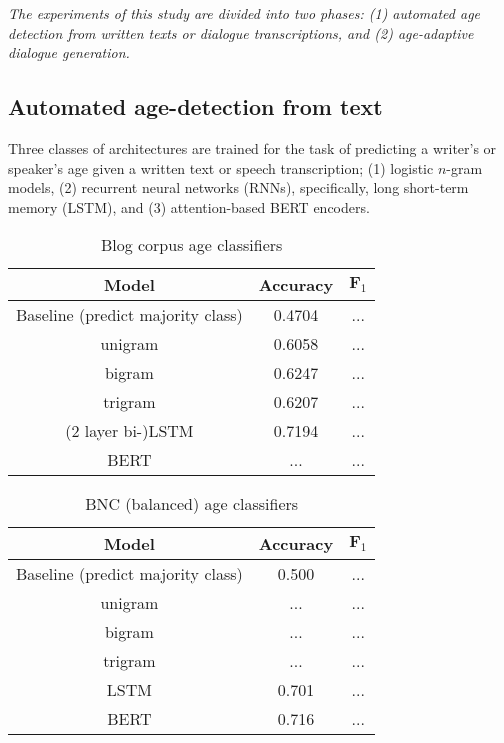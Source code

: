 \textit{The experiments of this study are divided into two phases: (1) automated age detection from written texts or dialogue transcriptions, and (2) age-adaptive dialogue generation.}

\subsection{Automated age-detection from text}

Three classes of architectures are trained for the task of predicting a writer's or speaker's age given a written text or speech transcription; (1) logistic $n$-gram models, (2) recurrent neural networks (RNNs), specifically, long short-term memory (LSTM), and (3) attention-based BERT encoders.

\begin{table}[H]
    \centering
    \begin{tabular}{c c c}
    \hline
    \textbf{Model} & \textbf{Accuracy} & $\boldsymbol{F}_1$\\
    \hline
    Baseline (predict majority class) & 0.4704 & ...\\
    unigram & 0.6058 & ...\\
    bigram & 0.6247 & ...\\
    trigram & 0.6207 & ...\\
    (2 layer bi-)LSTM & 0.7194 & ...\\
    BERT & ... & ...\\
    \hline
    \end{tabular}
    \caption{Blog corpus age classifiers}
    \label{tab:blog_classification}
\end{table}

\begin{table}[H]
    \centering
    \begin{tabular}{c c c}
    \hline
    \textbf{Model} & \textbf{Accuracy} & $\boldsymbol{F}_1$\\
    \hline
    Baseline (predict majority class) & 0.500 & ...\\
    unigram & ... & ...\\
    bigram & ... & ...\\
    trigram & ... & ...\\
    LSTM & 0.701 & ...\\
    BERT & 0.716 & ...\\
    \hline
    \end{tabular}
    \caption{BNC (balanced) age classifiers}
    \label{tab:bnc_classification}
\end{table}

